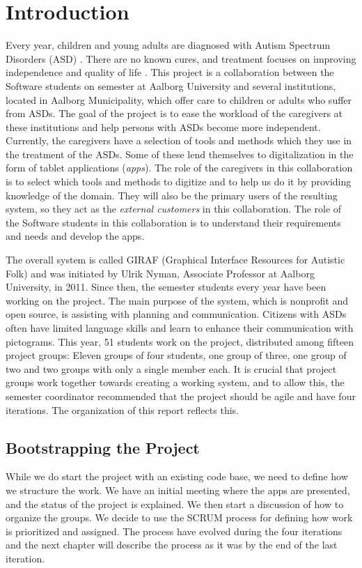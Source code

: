 \chapter{Introduction}
Every year, children and young adults are diagnosed with Autism Spectrum Disorders (ASD) \cite{autism_diagnosis_adults,autism_diagnosis_children}. There are no known cures, and treatment focuses on improving independence and quality of life \cite{Myers01112007}. This project is a collaboration between the Software students on  semester at Aalborg University and several institutions, located in Aalborg Municipality, which offer care to children or adults who suffer from ASDs. The goal of the project is to ease the workload of the caregivers at these institutions and help persons with ASDs become more independent. Currently, the caregivers have a selection of tools and methods which they use in the treatment of the ASDs. Some of these lend themselves to digitalization in the form of tablet applications (\emph{apps}). The role of the caregivers in this collaboration is to select which tools and methods to digitize and to help us do it by providing knowledge of the domain. They will also be the primary users of the resulting system, so they act as the \emph{external customers} in this collaboration. The role of the Software students in this collaboration is to understand their requirements and needs and develop the apps.

The overall system is called GIRAF (Graphical Interface Resources for Autistic Folk) and was initiated by Ulrik Nyman, Associate Professor at Aalborg University, in 2011. Since then, the  semester students every year have been working on the project. The main purpose of the system, which is nonprofit and open source, is assisting with planning and communication. Citizens with ASDs often have limited language skills and learn to enhance their communication with pictograms. This year, 51 students work on the project, distributed among fifteen project groups: Eleven groups of four students, one group of three, one group of two and two groups with only a single member each. It is crucial that project groups work together towards creating a working system, and to allow this, the semester coordinator recommended that the project should be agile and have four iterations. The organization of this report reflects this.

\section{Bootstrapping the Project}
While we do start the project with an existing code base, we need to define how we structure the work. We have an initial meeting where the apps are presented, and the status of the project is explained. We then start a discussion of how to organize the groups. We decide to use the SCRUM process for defining how work is prioritized and assigned. The process have evolved during the four iterations and the next chapter will describe the process as it was by the end of the last iteration.

